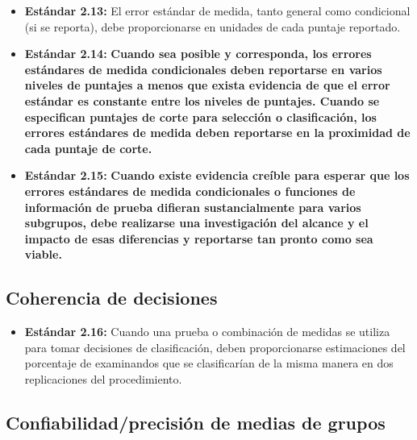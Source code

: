 \documentclass[
  letterpaper,
  DIV=11,
  numbers=noendperiod]{scrreprt}
\providecommand{\tightlist}{%
  \setlength{\itemsep}{0pt}\setlength{\parskip}{0pt}}
\begin{document}
\begin{itemize}
\tightlist
\item
  \textbf{Estándar 2.13:} El error estándar de medida, tanto general
  como condicional (si se reporta), debe proporcionarse en unidades de
  cada puntaje reportado.
\item
  \textbf{Estándar 2.14:} \textbf{Cuando sea posible y corresponda, los
  errores estándares de medida condicionales deben reportarse en varios
  niveles de puntajes a menos que exista evidencia de que el error
  estándar es constante entre los niveles de puntajes. Cuando se
  especifican puntajes de corte para selección o clasificación, los
  errores estándares de medida deben reportarse en la proximidad de cada
  puntaje de corte.}
\item
  \textbf{Estándar 2.15:} \textbf{Cuando existe evidencia creíble para
  esperar que los errores estándares de medida condicionales o funciones
  de información de prueba difieran sustancialmente para varios
  subgrupos, debe realizarse una investigación del alcance y el impacto
  de esas diferencias y reportarse tan pronto como sea viable.}
\end{itemize}

\subsection{Coherencia de decisiones}\label{coherencia-de-decisiones}

\begin{itemize}
\tightlist
\item
  \textbf{Estándar 2.16:} Cuando una prueba o combinación de medidas se
  utiliza para tomar decisiones de clasificación, deben proporcionarse
  estimaciones del porcentaje de examinandos que se clasificarían de la
  misma manera en dos replicaciones del procedimiento.
\end{itemize}

\subsection{Confiabilidad/precisión de medias de
grupos}\label{confiabilidadprecisiuxf3n-de-medias-de-grupos}
\end{document}
